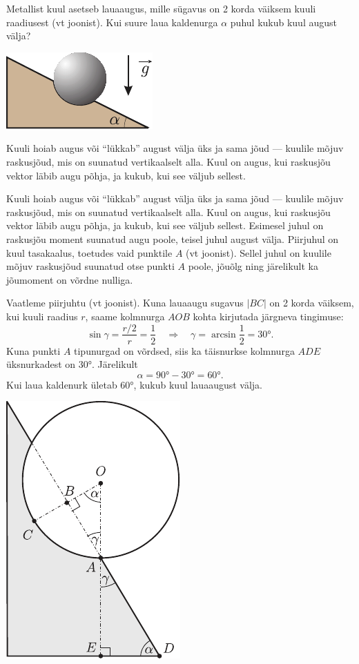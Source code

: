 
Metallist kuul asetseb lauaaugus, mille sügavus on 2 korda väiksem kuuli raadiusest (vt joonist). Kui suure laua kaldenurga $\alpha$ puhul kukub kuul august välja? 

\begin{center}
	\includegraphics[width=0.4\linewidth]{2005-lahg-03-yl}
\end{center}

\hint
Kuuli hoiab augus või \enquote{lükkab} august välja üks ja sama jõud --- kuulile mõjuv raskusjõud, mis on suunatud vertikaalselt alla. Kuul on augus, kui raskusjõu vektor läbib augu põhja, ja kukub, kui see väljub sellest.

\solu
Kuuli hoiab augus või \enquote{lükkab} august välja üks ja sama jõud --- kuulile mõjuv raskusjõud, mis on suunatud vertikaalselt alla. Kuul on augus, kui raskusjõu vektor läbib augu põhja, ja kukub, kui see väljub sellest. Esimesel juhul on raskusjõu moment suunatud augu poole, teisel juhul august välja. Piirjuhul on kuul tasakaalus, toetudes vaid punktile $A$ (vt joonist). Sellel juhul on kuulile mõjuv raskusjõud suunatud otse punkti $A$ poole, jõuõlg ning järelikult ka jõumoment on võrdne nulliga.

Vaatleme piirjuhtu (vt joonist). Kuna lauaaugu sugavus $|BC|$ on 2 korda väiksem, kui kuuli raadius $r$, saame kolmnurga $AOB$ kohta kirjutada järgneva tingimuse:
\[
\sin \gamma=\frac{r / 2}{r}=\frac{1}{2} \quad \Rightarrow \quad \gamma=\arcsin \frac{1}{2}=\ang{30}.
\]
Kuna punkti $A$ tipunurgad on võrdsed, siis ka täisnurkse kolmnurga $ADE$ üksnurkadest on \ang{30}. Järelikult
\[
\alpha = \ang{90} - \ang{30} = \ang{60}.
\]
Kui laua kaldenurk ületab \ang{60}, kukub kuul lauaaugust välja.
\begin{center}
	\includegraphics[width=0.35\linewidth]{2005-lahg-03-lah}
\end{center}
\probend